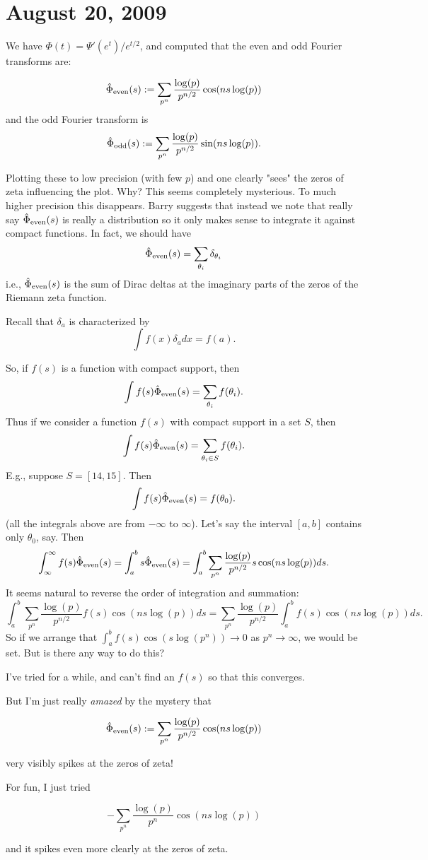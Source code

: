 \documentclass{article}
\begin{document}
\section{August 20, 2009}

We have $\Phi(t) = \Psi'(e^t)/e^{t/2}$, and computed that the even and odd
Fourier transforms are:

$${\hat \Phi}_{\rm even}(s): = \sum_{p^n} {\frac{\log(p)}{p^{n/2}}}\cos(ns \log(p))$$ 
and the odd Fourier transform is
$${\hat \Phi}_{\rm odd}(s): = \sum_{p^n} {\frac{\log(p)}{p^{n/2}}}\sin(ns \log(p)).$$
   
   
Plotting these to low precision (with few $p$) and one clearly "sees" the zeros of zeta influencing
the plot.   Why?  This seems completely mysterious.   To much higher precision this disappears.
Barry suggests that instead we note that really say
${\hat \Phi}_{\rm even}(s)$ is really a distribution so it only makes sense to
integrate it against compact functions.  In fact, we should have
$$
   {\hat \Phi}_{\rm even}(s) = \sum_{\theta_i} \delta_{\theta_i}
$$
i.e., ${\hat \Phi}_{\rm even}(s)$ is the sum of Dirac deltas at the imaginary parts
of the zeros of the Riemann zeta function.

Recall that $\delta_a$ is characterized by 
$$
\int f(x) \delta_a dx = f(a).
$$

So, if $f(s)$ is a function with compact support, then 
$$
  \int f(s) {\hat \Phi}_{\rm even}(s) = \sum_{\theta_i} f(\theta_i).
$$
Thus if we consider a function $f(s)$ with compact support in a set $S$, then
$$
  \int f(s) {\hat \Phi}_{\rm even}(s) = \sum_{\theta_i\in S} f(\theta_i).
$$
E.g., suppose $S=[14,15]$.  Then 
$$
  \int f(s) {\hat \Phi}_{\rm even}(s) = f(\theta_0).
$$
(all the integrals above are from $-\infty$ to $\infty$).
 Let's say the interval $[a,b]$ contains only $\theta_0$, say.
Then 
$$
\int_{\infty}^{\infty} f(s) {\hat \Phi}_{\rm even}(s)
 = 
\int_{a}^{b} s {\hat \Phi}_{\rm even}(s)
= \int_{a}^{b} \sum_{p^n} {\frac{\log(p)}{p^{n/2}}} s\cos(ns \log(p))  ds.
$$
It seems natural to reverse the order of integration and summation:
$$
\int_{a}^{b} \sum_{p^n} {\frac{\log(p)}{p^{n/2}}} f(s)\cos(ns \log(p))  ds
 = 
 \sum_{p^n} {\frac{\log(p)}{p^{n/2}}} \int_{a}^{b} f(s)\cos(ns\log(p)) ds.
$$
So if we arrange that $\int_{a}^{b} f(s)\cos(s\log(p^n)) \to 0$ as
$p^n\to\infty$, we would be set.   But is there any way to do this?


I've tried for a while, and can't find an $f(s)$ so that this converges.

But I'm just really {\em amazed} by the mystery that 

$${\hat \Phi}_{\rm even}(s): = \sum_{p^n} {\frac{\log(p)}{p^{n/2}}}\cos(ns \log(p))$$ 

very visibly spikes at the zeros of zeta!

For fun, I just tried 

$$-\sum_{p^n} {\frac{\log(p)}{p^n}}\cos(ns \log(p))$$ 

and it spikes even more clearly at the zeros of zeta. 
\end{document}
